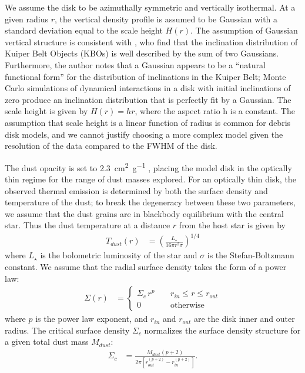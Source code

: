 \documentclass[modern]{aastex62}
\begin{document}
We assume the disk to be azimuthally symmetric and vertically isothermal. 
At a given radius $r$, the vertical density profile is assumed to be Gaussian with a standard deviation equal to the scale height $H(r)$.
The assumption of Gaussian vertical structure is consistent with \cite{brown01}, who find that the inclination distribution of Kuiper Belt Objects (KBOs) is well described by the sum of two Gaussians.
Furthermore, the author notes that a Gaussian appears to be a ``natural functional form'' for the distribution of inclinations in the Kuiper Belt; Monte Carlo simulations of dynamical interactions in a disk with initial inclinations of zero produce an inclination distribution that is perfectly fit by a Gaussian.
The scale height is given by $H(r) = hr$, where the aspect ratio h is a constant.
The assumption that scale height is a linear function of radius is common for debris disk models, and we cannot justify choosing a more complex model given the resolution of the data compared to the FWHM of the disk.

The dust opacity is set to \SI{2.3}{\cm^2.\gram^{-1}} \citep{beckwith90}, placing the model disk in the optically thin regime for the range of dust masses explored.
For an optically thin disk, the observed thermal emission is determined by both the surface density and temperature of the dust; to break the degeneracy between these two parameters, we assume that the dust grains are in blackbody equilibrium with the central star.
Thus the dust temperature at a distance $r$ from the host star is given by
\begin{align}
  T_{dust} (r) &= \left( \frac{L_{\star}}{16 \pi r^2 \sigma} \right)^{1/4}
\end{align}
where $L_{\star}$ is the bolometric luminosity of the star and $\sigma$ is the Stefan-Boltzmann constant. We assume that the radial surface density takes the form of a power law: 
\begin{align}
  \Sigma(r) &= 
  \begin{cases}
    \Sigma_c \, r^{p} \; \; \; \; & r_{in} \leq r \leq r_{out} \\
    0 \; \; \; \; &\mbox{otherwise} 
  \end{cases}
\end{align}
where $p$ is the power law exponent, and $r_{in}$ and $r_{out}$ are the disk inner and outer radius. 
The critical surface density $\Sigma_c$ normalizes the surface density structure for a given total dust mass $M_{dust}$:
\begin{align}
\Sigma_c &= \frac{M_{dust} \left(p + 2 \right)}{2 \pi \left[ r_{out}^{(p+2)} - r_{in}^{(p+2)} \right]}.
\end{align}
\end{document}
